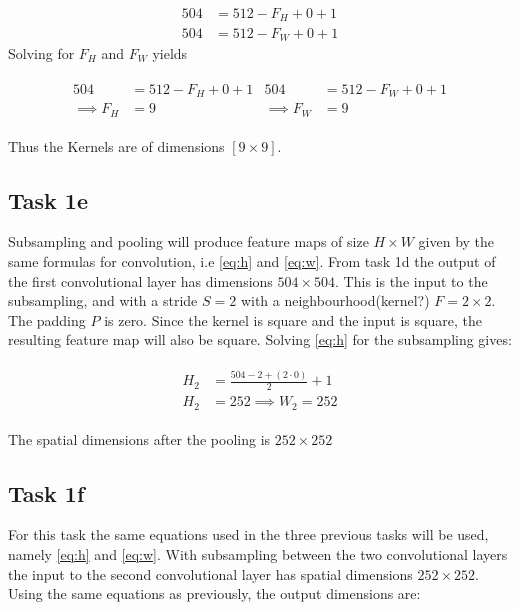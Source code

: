 \documentclass{article}
\begin{document}
\begin{align}
    504 &= 512 - F_H + 0 + 1 \\
    504 &= 512 - F_W + 0 + 1
\end{align}
Solving for $F_H$ and $F_W$ yields

\begin{align}
    \begin{split}
        504 &= 512 - F_H + 0 + 1 \\
        \implies F_H &= 9
    \end{split}
    \begin{split}
        504 &= 512 - F_W + 0 + 1 \\
        \implies F_W &= 9
    \end{split}
\end{align}

Thus the Kernels are of dimensions $[9\times 9]$.

\subsection{Task 1e}
Subsampling and pooling will produce feature maps of size $H \times W$ given by the same formulas for convolution, i.e \autoref{eq:h} and \autoref{eq:w}. From  task 1d the output of the first convolutional layer has dimensions $504 \times 504$. This is the input to the subsampling, and with a stride $S=2$ with a neighbourhood(kernel?)  $F = 2 \times 2$. The padding $P$ is zero. Since the kernel is square and the input is square, the resulting feature map will also be square. Solving \autoref{eq:h} for the subsampling gives:


\begin{align}
\begin{split}
    H_2 &= \frac{504 -2 + (2\cdot 0)}{2}  +1 \\
    H_2 &= 252
    \implies W_2 = 252
\end{split}
\end{align}

The spatial dimensions after the pooling is $ 252 \times 252$ 

\subsection{Task 1f}
For this task the same equations used in the three previous tasks will be used, namely \autoref{eq:h} and \autoref{eq:w}. With subsampling between the two convolutional layers the input to the second convolutional layer has spatial dimensions $252 \times 252$. Using the same equations as previously, the output dimensions are:
\end{document}
